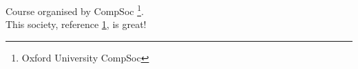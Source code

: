 
Course organised by CompSoc
\footnote{\label{CompSoc}Oxford University CompSoc}.\\

This society, reference \ref{CompSoc}, is great!

